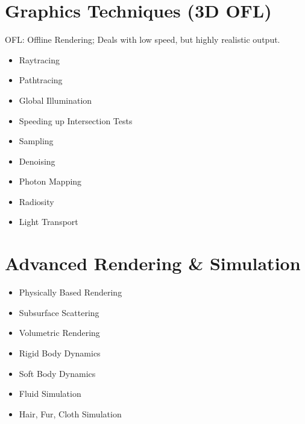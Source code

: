 \section{Graphics Techniques (3D OFL)}
OFL: Offline Rendering; Deals with low speed, but highly realistic output.
\begin{itemize}
    \item Raytracing
    \item Pathtracing
    \item Global Illumination
    \item Speeding up Intersection Tests
    \item Sampling
    \item Denoising
    \item Photon Mapping
    \item Radiosity
    \item Light Transport
\end{itemize}

\section{Advanced Rendering \& Simulation}
\begin{itemize}
\item Physically Based Rendering
\item Subsurface Scattering
\item Volumetric Rendering
\item Rigid Body Dynamics
\item Soft Body Dynamics
\item Fluid Simulation
\item Hair, Fur, Cloth Simulation
\end{itemize}
\clearpage